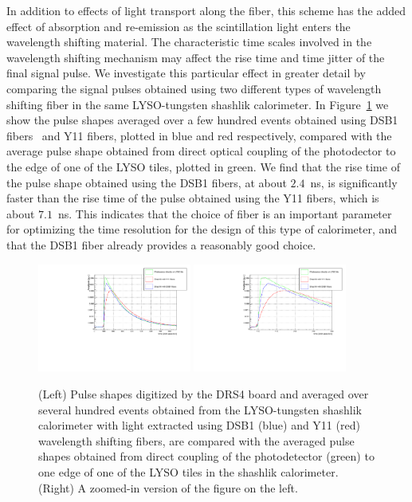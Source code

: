 \documentclass[12pt]{article}
\begin{document}
In addition to effects of light transport along the fiber, 
this scheme has the added effect of absorption and re-emission as 
the scintillation light enters the wavelength shifting material. 
The characteristic time scales involved in the wavelength shifting 
mechanism may affect the rise time and time jitter of the final signal 
pulse. We investigate this particular effect in greater detail by
comparing the signal pulses obtained using two different types
of wavelength shifting fiber in the same LYSO-tungsten shashlik
calorimeter. In Figure~\ref{fig:FiberPulseComparison} we show
the pulse shapes averaged over a few hundred events obtained 
using DSB1 fibers~\cite{Albrecht} and Y11 fibers, plotted in blue and red respectively,
compared with the average pulse shape obtained from direct optical 
coupling of the photodector to the edge of one of the LYSO tiles, plotted in green.
We find that the rise time of the pulse shape obtained using the 
DSB1 fibers, at about $2.4$~ns, is significantly faster than the rise time
of the pulse obtained using the Y11 fibers, which is about $7.1$~ns. This indicates
that the choice of fiber is an important parameter for 
optimizing the time resolution for the design of 
this type of calorimeter, and that the DSB1 fiber 
already provides a reasonably good choice.

\begin{figure}[H] \centering
\includegraphics[width=0.45\textwidth]{figs/FiberPulses} 
\includegraphics[width=0.45\textwidth]{figs/FiberPulsesZoom} 
\caption{(Left) Pulse shapes digitized by the DRS4 board and averaged over several hundred events 
obtained from the LYSO-tungsten shashlik calorimeter with light extracted using
DSB1 (blue) and Y11 (red) wavelength shifting fibers, are compared with 
the averaged pulse shapes obtained from direct coupling of the photodetector (green)
to one edge of one of the LYSO tiles in the shashlik calorimeter. (Right) A zoomed-in version of the figure on the left.} 
\label{fig:FiberPulseComparison}
\end{figure}
\end{document}

